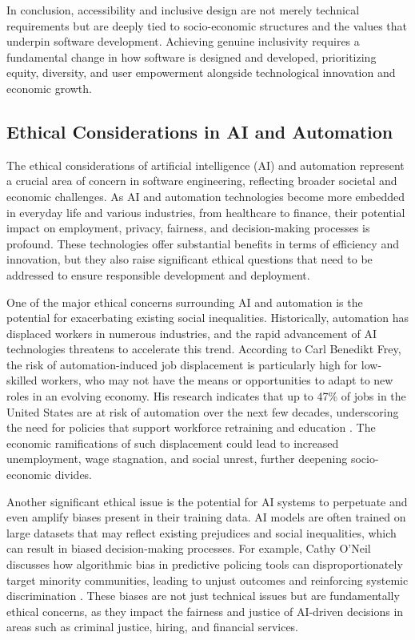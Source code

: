 \begin{refsection}
In conclusion, accessibility and inclusive design are not merely technical requirements but are deeply tied to socio-economic structures and the values that underpin software development. Achieving genuine inclusivity requires a fundamental change in how software is designed and developed, prioritizing equity, diversity, and user empowerment alongside technological innovation and economic growth.

\subsection{Ethical Considerations in AI and Automation}

The ethical considerations of artificial intelligence (AI) and automation represent a crucial area of concern in software engineering, reflecting broader societal and economic challenges. As AI and automation technologies become more embedded in everyday life and various industries, from healthcare to finance, their potential impact on employment, privacy, fairness, and decision-making processes is profound. These technologies offer substantial benefits in terms of efficiency and innovation, but they also raise significant ethical questions that need to be addressed to ensure responsible development and deployment.

One of the major ethical concerns surrounding AI and automation is the potential for exacerbating existing social inequalities. Historically, automation has displaced workers in numerous industries, and the rapid advancement of AI technologies threatens to accelerate this trend. According to Carl Benedikt Frey, the risk of automation-induced job displacement is particularly high for low-skilled workers, who may not have the means or opportunities to adapt to new roles in an evolving economy. His research indicates that up to 47\% of jobs in the United States are at risk of automation over the next few decades, underscoring the need for policies that support workforce retraining and education \cite[pp.~178-181]{frey2020technology}. The economic ramifications of such displacement could lead to increased unemployment, wage stagnation, and social unrest, further deepening socio-economic divides.

Another significant ethical issue is the potential for AI systems to perpetuate and even amplify biases present in their training data. AI models are often trained on large datasets that may reflect existing prejudices and social inequalities, which can result in biased decision-making processes. For example, Cathy O'Neil discusses how algorithmic bias in predictive policing tools can disproportionately target minority communities, leading to unjust outcomes and reinforcing systemic discrimination \cite[pp.~97-99]{oneil2016weapons}. These biases are not just technical issues but are fundamentally ethical concerns, as they impact the fairness and justice of AI-driven decisions in areas such as criminal justice, hiring, and financial services.


\end{refsection}
